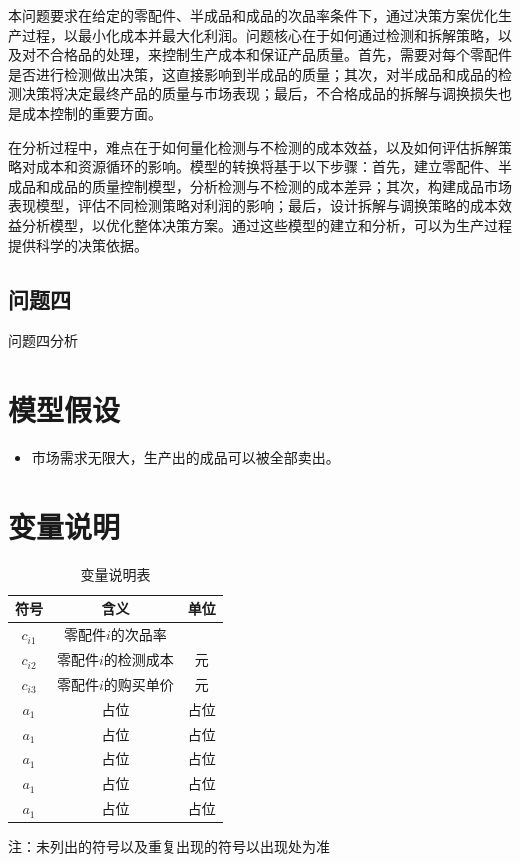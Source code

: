 \documentclass[withoutpreface,bwprint]{cumcmthesis}
\begin{document}
本问题要求在给定的零配件、半成品和成品的次品率条件下，通过决策方案优化生产过程，以最小化成本并最大化利润。问题核心在于如何通过检测和拆解策略，以及对不合格品的处理，来控制生产成本和保证产品质量。首先，需要对每个零配件是否进行检测做出决策，这直接影响到半成品的质量；其次，对半成品和成品的检测决策将决定最终产品的质量与市场表现；最后，不合格成品的拆解与调换损失也是成本控制的重要方面。

在分析过程中，难点在于如何量化检测与不检测的成本效益，以及如何评估拆解策略对成本和资源循环的影响。模型的转换将基于以下步骤：首先，建立零配件、半成品和成品的质量控制模型，分析检测与不检测的成本差异；其次，构建成品市场表现模型，评估不同检测策略对利润的影响；最后，设计拆解与调换策略的成本效益分析模型，以优化整体决策方案。通过这些模型的建立和分析，可以为生产过程提供科学的决策依据。

\subsection{问题四}
问题四分析

\section{模型假设}
\begin{itemize}
    \item 市场需求无限大，生产出的成品可以被全部卖出。
\end{itemize}


\section{变量说明}
\begin{table}[htbp]
    \centering
    \begin{threeparttable}
    \caption{变量说明表}
    \begin{tabular}{ccc}
        \toprule
        符号 & 含义 & 单位 \\
        \midrule
        $c_{i1}$ & 零配件$i$的次品率 &    \\
        $c_{i2}$ & 零配件$i$的检测成本 & 元 \\
        $c_{i3}$ & 零配件$i$的购买单价 & 元 \\
        $a_1$ & 占位 & 占位 \\
        $a_1$ & 占位 & 占位 \\
        $a_1$ & 占位 & 占位 \\
        $a_1$ & 占位 & 占位 \\
        $a_1$ & 占位 & 占位 \\
        \bottomrule
    \end{tabular}
    \begin{tablenotes}
        \item 注：未列出的符号以及重复出现的符号以出现处为准
    \end{tablenotes}
    \end{threeparttable}
\end{table}
\end{document}
